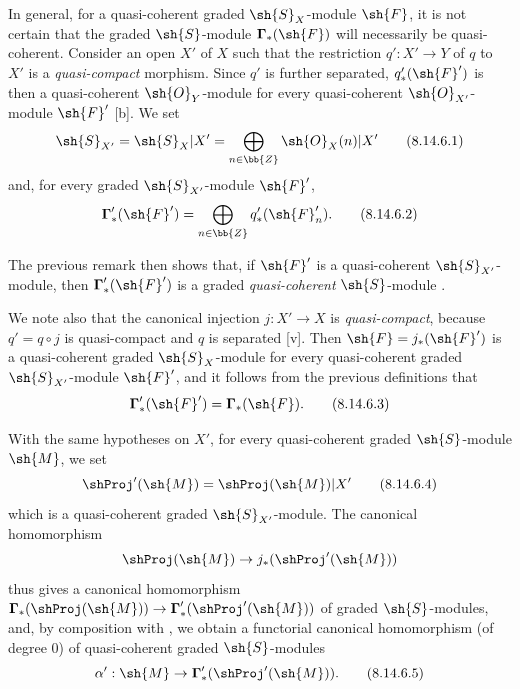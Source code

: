 \begin{env}[8.14.6]
\label{II.8.14.6}
In general, for a quasi-coherent graded $\sh{S}_X$-module $\sh{F}$, it is not certain that the graded $\sh{S}$-module $\boldsymbol{\Gamma}_*(\sh{F})$ will necessarily be quasi-coherent.
Consider an open $X'$ of $X$ such that the restriction $q':X'\to Y$ of $q$ to $X'$ is a \emph{quasi-compact} morphism.
Since $q'$ is further separated, $q'_*(\sh{F}')$ is then a quasi-coherent $\sh{O}_Y$-module for every quasi-coherent $\sh{O}_{X'}$-module $\sh{F}'$ [b].
We set
\[
\label{II.8.14.6.1}
    \sh{S}_{X'} = \sh{S}_X|X' = \bigoplus_{n\in\bb{Z}}\sh{O}_X(n)|X'
\tag{8.14.6.1}
\]
and, for every graded $\sh{S}_{X'}$-module $\sh{F}'$,
\[
\label{II.8.14.6.2}
    \boldsymbol{\Gamma}'_*(\sh{F}') = \bigoplus_{n\in\bb{Z}}q'_*(\sh{F}'_n).
\tag{8.14.6.2}
\]

The previous remark then shows that, if $\sh{F}'$ is a quasi-coherent $\sh{S}_{X'}$-module, then $\boldsymbol{\Gamma}'_*(\sh{F}')$ is a graded \emph{quasi-coherent} $\sh{S}$-module .

We note also that the canonical injection $j:X'\to X$ is \emph{quasi-compact}, because $q'=q\circ j$ is quasi-compact and $q$ is separated [v].
Then $\sh{F}=j_*(\sh{F}')$ is a quasi-coherent graded $\sh{S}_X$-module for every quasi-coherent graded $\sh{S}_{X'}$-module $\sh{F}'$, and it follows from the previous definitions that
\[
\label{II.8.14.6.3}
    \boldsymbol{\Gamma}'_*(\sh{F}') = \boldsymbol{\Gamma}_*(\sh{F}).
\tag{8.14.6.3}
\]

With the same hypotheses on $X'$, for every quasi-coherent graded $\sh{S}$-module $\sh{M}$, we set
\[
\label{II.8.14.6.4}
    \shProj'(\sh{M}) = \shProj(\sh{M})|X'
\tag{8.14.6.4}
\]
which is a quasi-coherent graded $\sh{S}_{X'}$-module.
The canonical homomorphism
\[
    \shProj(\sh{M}) \to j_*(\shProj'(\sh{M}))
\]
 thus gives a canonical homomorphism $\boldsymbol{\Gamma}_*(\shProj(\sh{M}))\to\boldsymbol{\Gamma}'_*(\shProj'(\sh{M}))$ of graded $\sh{S}$-modules, and, by composition with , we obtain a functorial canonical homomorphism (of degree $0$) of quasi-coherent graded $\sh{S}$-modules
\[
\label{II.8.14.6.5}
    \alpha': \sh{M} \to \boldsymbol{\Gamma}'_*(\shProj'(\sh{M})).
\tag{8.14.6.5}
\]
\end{env}

